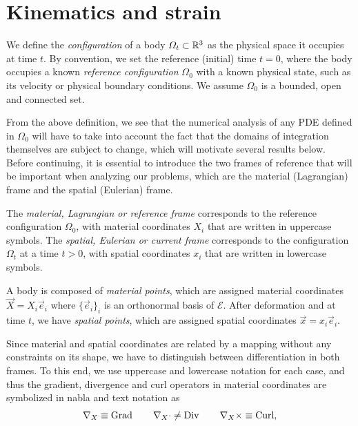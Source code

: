 \section{Kinematics and strain}\label{sec:kinematics-strain}
\begin{definition}[Configuration]\label{def:configuration}
    We define the \emph{configuration} of a body $\Omega_t\subset \mathbb{R}^3$ as the physical space it occupies at time $t$. By convention, we set the reference (initial) time $t=0$, where the body occupies a known \emph{reference configuration} $\Omega_0$ with a known physical state, such as its velocity or physical boundary conditions. We assume $\Omega_0$ is a bounded, open and connected set.
\end{definition}
From the above definition, we see that the numerical analysis of any PDE defined in $\Omega_0$ will have to take into account the fact that the domains of integration themselves are subject to change, which will motivate several results below. Before continuing, it is essential to introduce the two frames of reference that will be important when analyzing our problems, which are the material (Lagrangian) frame and the spatial (Eulerian) frame. 
\begin{definition}\label{def:frames}
    The \emph{material, Lagrangian or reference frame} corresponds to the reference configuration $\Omega_0$, with material coordinates $X_i$ that are written in uppercase symbols. The \emph{spatial, Eulerian or current frame} corresponds to the configuration $\Omega_t$ at a time $t>0$, with spatial coordinates $x_i$ that are written in lowercase symbols. 

    A body is composed of \emph{material points}, which are assigned material coordinates $\vec X=X_i\vec e_i$ where $\{\vec e_i\}_i$ is an orthonormal basis of $\mathcal{E}$. After deformation and at time $t$, we have \emph{spatial points}, which are assigned spatial coordinates $\vec x = x_i\vec e_i$.
\end{definition}
Since material and spatial coordinates are related by a mapping without any constraints on its shape, we have to distinguish between differentiation in both frames. To this end, we use uppercase and lowercase notation for each case, and thus the gradient, divergence and curl operators in material coordinates are symbolized in nabla and text notation as 
\begin{equation}
    \nabla_X \equiv \operatorname{\text{Grad}} \qquad \nabla_X\cdot \neq \operatorname{\text{Div}} \qquad \nabla_X \times \equiv \operatorname{\text{Curl}},
\end{equation}
